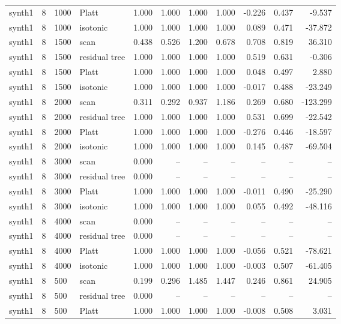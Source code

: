 \begin{tabular}{lrllrrrrrrr}
synth1 & 8 & 1000 & Platt & 1.000 & 1.000 & 1.000 & 1.000 & -0.226 & 0.437 & -9.537 \\
synth1 & 8 & 1000 & isotonic & 1.000 & 1.000 & 1.000 & 1.000 & 0.089 & 0.471 & -37.872 \\
synth1 & 8 & 1500 & scan & 0.438 & 0.526 & 1.200 & 0.678 & 0.708 & 0.819 & 36.310 \\
synth1 & 8 & 1500 & residual tree & 1.000 & 1.000 & 1.000 & 1.000 & 0.519 & 0.631 & -0.306 \\
synth1 & 8 & 1500 & Platt & 1.000 & 1.000 & 1.000 & 1.000 & 0.048 & 0.497 & 2.880 \\
synth1 & 8 & 1500 & isotonic & 1.000 & 1.000 & 1.000 & 1.000 & -0.017 & 0.488 & -23.249 \\
synth1 & 8 & 2000 & scan & 0.311 & 0.292 & 0.937 & 1.186 & 0.269 & 0.680 & -123.299 \\
synth1 & 8 & 2000 & residual tree & 1.000 & 1.000 & 1.000 & 1.000 & 0.531 & 0.699 & -22.542 \\
synth1 & 8 & 2000 & Platt & 1.000 & 1.000 & 1.000 & 1.000 & -0.276 & 0.446 & -18.597 \\
synth1 & 8 & 2000 & isotonic & 1.000 & 1.000 & 1.000 & 1.000 & 0.145 & 0.487 & -69.504 \\
synth1 & 8 & 3000 & scan & 0.000 & -- & -- & -- & -- & -- & -- \\
synth1 & 8 & 3000 & residual tree & 0.000 & -- & -- & -- & -- & -- & -- \\
synth1 & 8 & 3000 & Platt & 1.000 & 1.000 & 1.000 & 1.000 & -0.011 & 0.490 & -25.290 \\
synth1 & 8 & 3000 & isotonic & 1.000 & 1.000 & 1.000 & 1.000 & 0.055 & 0.492 & -48.116 \\
synth1 & 8 & 4000 & scan & 0.000 & -- & -- & -- & -- & -- & -- \\
synth1 & 8 & 4000 & residual tree & 0.000 & -- & -- & -- & -- & -- & -- \\
synth1 & 8 & 4000 & Platt & 1.000 & 1.000 & 1.000 & 1.000 & -0.056 & 0.521 & -78.621 \\
synth1 & 8 & 4000 & isotonic & 1.000 & 1.000 & 1.000 & 1.000 & -0.003 & 0.507 & -61.405 \\
synth1 & 8 & 500 & scan & 0.199 & 0.296 & 1.485 & 1.447 & 0.246 & 0.861 & 24.905 \\
synth1 & 8 & 500 & residual tree & 0.000 & -- & -- & -- & -- & -- & -- \\
synth1 & 8 & 500 & Platt & 1.000 & 1.000 & 1.000 & 1.000 & -0.008 & 0.508 & 3.031 \\

\end{tabular}

